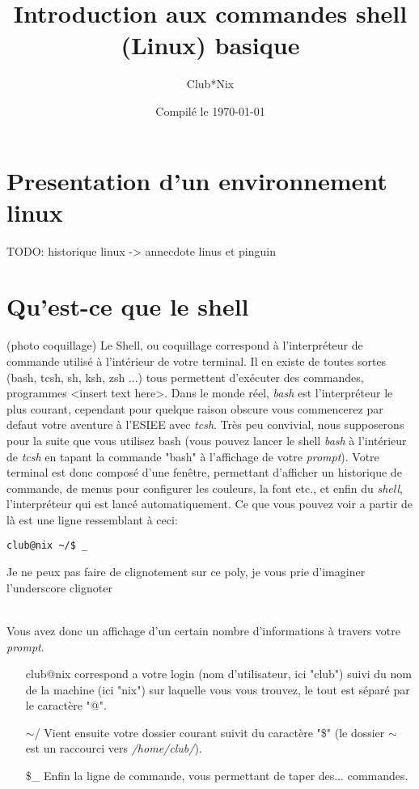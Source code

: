 \documentclass[french, a4paper, 12pt, titlepage]{article}
\begin{document}
\title{Introduction aux commandes shell (Linux) basique}
\author{Club*Nix}
\date{Compilé le \today}

\maketitle

\vfill
\pagebreak

\newpage
\strut\thispagestyle{empty}
\vfill
\pagebreak
\tableofcontents
\strut\thispagestyle{empty}
\newpage
\setcounter{page}{1}

\section{Presentation d'un environnement linux}
TODO: historique linux
-> annecdote linus et pinguin

\section{Qu'est-ce que le shell}
(photo coquillage)
Le Shell, ou coquillage correspond à l'interpréteur de commande utilisé à l'intérieur de votre terminal.
Il en existe de toutes sortes (bash, tcsh, sh, ksh, zsh ...) tous permettent d'exécuter des commandes, programmes <insert text here>.
Dans le monde réel, \emph{bash} est l'interpréteur le plus courant, cependant pour quelque raison obscure vous commencerez par defaut votre aventure à l'ESIEE avec \emph{tcsh}.
Très peu convivial, nous supposerons pour la suite que vous utilisez bash (vous pouvez lancer le shell \emph{bash} à l'intérieur de \emph{tcsh} en tapant la commande "bash" à l'affichage de votre \emph{prompt}).
Votre terminal est donc composé d'une fenêtre, permettant d'afficher un historique de commande, de menus pour configurer les couleurs, la font etc., et enfin du \emph{shell}, l'interpréteur qui est lancé automatiquement.
Ce que vous pouvez voir a partir de là est une ligne ressemblant à ceci:
\begin{lstlisting}
club@nix ~/$ _
\end{lstlisting}
\begin{tiny}
Je ne peux pas faire de clignotement sur ce poly, je vous prie d'imaginer l'underscore clignoter
\end{tiny}\\
Vous avez donc un affichage d'un certain nombre d'informations à travers votre \emph{prompt}.
\begin{enumerate}
\item[club@nix] correspond a votre login (nom d'utilisateur, ici "club") suivi du nom de la machine (ici "nix") sur laquelle vous vous trouvez, le tout est séparé par le caractère "@".
\item[$\sim$/] Vient ensuite votre dossier courant suivit du caractère "\$" (le dossier $\sim$ est un raccourci vers \emph{/home/club/}).
\item[\$\_] Enfin la ligne de commande, vous permettant de taper des... commandes.
\end{enumerate}
\end{document}
